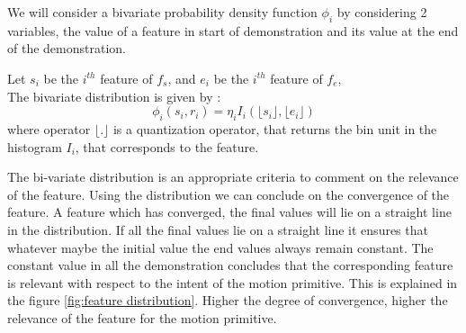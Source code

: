 We will consider a bivariate probability density function $\phi_i$  by
considering 2 variables, the value of a feature in start of demonstration and
its value at the end of the demonstration.

Let $s_i$ be the $i^{th}$ feature of $f_s$, 
and $e_i$ be the $i^{th}$ feature of $f_e$, \\
The bivariate distribution is given by :
\begin{equation}
    \phi_i(s_i , r_i) = \eta_i I_i ( \lfloor s_i \rfloor, \lfloor e_i \rfloor)
\end{equation}
where operator $\lfloor .  \rfloor$ is  a quantization operator, that returns the bin unit in 
the histogram $I_i$, that corresponds to the feature.

The bi-variate distribution is an appropriate criteria to comment on the
relevance of the feature. Using the distribution we can conclude on the
convergence of the feature. A feature which has converged, the final values
will lie on a straight line in the distribution. If all the final values lie on
a straight line it ensures that whatever maybe the initial value the end values
always remain constant. The constant value in all the demonstration concludes
that the corresponding feature is relevant with respect to the intent of the
motion primitive.
This is explained in the figure \ref{fig:feature distribution}. Higher the
degree of convergence, higher the relevance of the feature for the motion
primitive.
